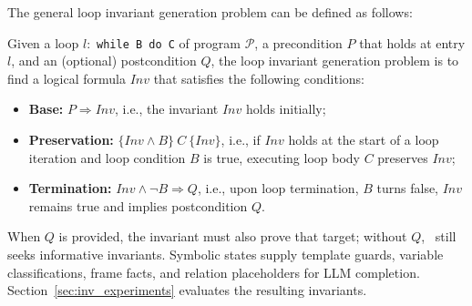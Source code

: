 
The general loop invariant generation problem can be defined as follows:
\begin{definition} Given a loop $l:\!$ \texttt{while B do C} of program $\mathcal{P}$, a precondition $P$ that holds at entry $l$, and an (optional) postcondition $Q$, the loop invariant generation problem is to find a logical formula $\textit{Inv}$ 
that satisfies the following conditions:
\begin{itemize}
    \item \textbf{Base:} $P \Rightarrow \textit{Inv}$, i.e., the invariant $\textit{Inv}$ holds initially;
    \item \textbf{Preservation:} $\{\textit{Inv} \land B\}\ C\ \{\textit{Inv}\}$, i.e., if $\textit{Inv}$ holds at the start of a loop iteration and loop condition $B$ is true, executing loop body $C$ preserves $\textit{Inv}$;
\item  \textbf{Termination:} $\textit{Inv} \land \neg B \Rightarrow Q$, i.e., upon loop termination, $B$ turns false, $\textit{Inv}$ remains true and implies postcondition $Q$.
\end{itemize}
  \label{Def:invariant}   
\end{definition}

When $Q$ is provided, the invariant must also prove that target; without $Q$, \toolname\ still seeks informative invariants. Symbolic states supply template guards, variable classifications, frame facts, and relation placeholders for LLM completion. Section~\ref{sec:inv_experiments} evaluates the resulting invariants.
  

